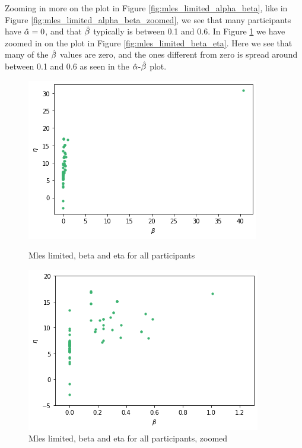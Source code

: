 Zooming in more on the plot in Figure \ref{fig:mles_limited_alpha_beta}, like in Figure \ref{fig:mles_limited_alpha_beta_zoomed}, we see that many participants have $\hat{\alpha}=0$, and that $\hat{\beta}$ typically is between 0.1 and 0.6. In Figure \ref{fig:mles_limited_beta_eta_zoomed} we have zoomed in on the plot in Figure \ref{fig:mles_limited_beta_eta}. Here we see that many of the $\hat{\beta}$ values are zero, and the ones different from zero is spread around between 0.1 and 0.6 as seen in the $\hat{\alpha}$-$\hat{\beta}$ plot. 
\begin{figure}
    \centering
    \begin{minipage}{0.48\textwidth}
        \centering
        \includegraphics[scale=0.38]{pictures/plotted_mles_limited_beta_eta_gk1.png}
        \caption{Mles limited, beta and eta for all participants}
        \label{fig:mles_limited_beta_eta}
    \end{minipage}
    \hfill
    \begin{minipage}{0.48\textwidth}
        \centering
        \includegraphics[scale=0.38]{pictures/plotted_mles_limited_beta_eta_zoomed_gk1.png}
        \caption{Mles limited, beta and eta for all participants, zoomed}
        \label{fig:mles_limited_beta_eta_zoomed}
    \end{minipage}
\end{figure}

